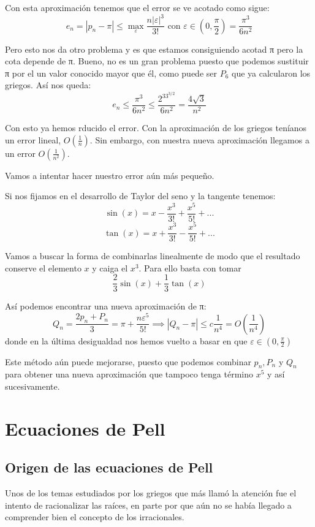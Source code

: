 \documentclass{apuntes}
\begin{document}
Con esta aproximación tenemos que el error se ve acotado como sigue:
\[e_n = |p_n-π| \leq \max_ε \frac{n|ε|^3}{3!} \text{ con } ε \in \left( 0, \frac{π}{2} \right) = \frac{π^3}{6n^2}\]

Pero esto nos da otro problema y es que estamos consiguiendo acotad π pero la cota depende de π. Bueno, no es un gran problema puesto que podemos sustituir π por el un valor conocido mayor que él, como puede ser $P_6$ que ya calcularon los griegos. Así nos queda:
\[e_n \leq \frac{π^3}{6n^2} \leq \frac{2^33^{3/2}}{6n^2}=\frac{4\sqrt{3}}{n^2}\]

Con esto ya hemos rducido el error. Con la aproximación de los griegos teníanos un error lineal, $O\left( \frac{1}{n}\right)$. Sin embargo, con nuestra nueva aproximación llegamos a un error $O\left( \frac{1}{n^2}\right)$.

Vamos a intentar hacer nuestro error aún más pequeño.

Si nos fijamos en el desarrollo de Taylor del seno y la tangente tenemos:
\[\sin(x)=x-\frac{x^3}{3!}+\frac{x^5}{5!}+...\]
\[\tan(x)=x+\frac{x^3}{3!}-\frac{x^5}{5!}+...\]

Vamos a buscar la forma de combinarlas linealmente de modo que el resultado conserve el elemento $x$ y caiga el $x^3$. Para ello basta con tomar
\[\frac{2}{3}\sin(x)+\frac{1}{3}\tan(x)\]

Así podemos encontrar una nueva aproximación de π:
\[Q_n = \frac{2p_n+P_n}{3} = π + \frac{nε^5}{5!} \implies |Q_n-π| \leq c\frac{1}{n^4}=O\left( \frac{1}{n^4}\right)\]
donde en la última desigualdad nos hemos vuelto a basar en que $ε\in\left( 0, \frac{π}{2} \right)$

Este método aún puede mejorarse, puesto que podemos combinar $p_n,P_n$ y $Q_n$ para obtener una nueva aproximación que tampoco tenga término $x^5$ y así sucesivamente.

\chapter{Ecuaciones de Pell}

\section{Origen de las ecuaciones de Pell}
Unos de los temas estudiados por los griegos que más llamó la atención fue el intento de racionalizar las raíces, en parte por que aún no se había llegado a comprender bien el concepto de los irracionales.
\end{document}
